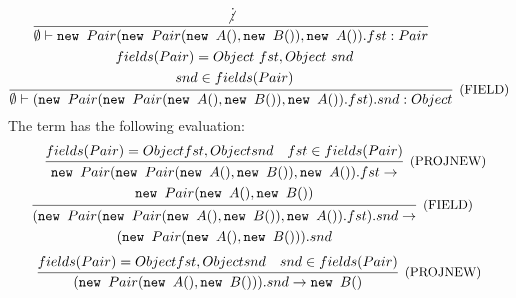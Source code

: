 \begin{itemize}
	      \[
		      \infer[\text{\small{(FIELD)}}]
		      { \emptyset \vdash (\NEW Pair(\NEW Pair(\NEW A(), \NEW B()), \NEW A()).fst).snd: Object }
		      {
			      \begin{gathered}
				      \infer[]
				      { \emptyset \vdash \NEW Pair(\NEW Pair(\NEW A(), \NEW B()), \NEW A()).fst: Pair }
				      { \not\vdots } \\
				      fields(Pair) = Object\ fst, Object\ snd \\
				      snd \in fields(Pair)
			      \end{gathered}
		      }
	      \]
	      The term has the following evaluation:
	      \[
		      \infer[\text{\small{(FIELD)}}]
		      {
			      \begin{gathered}
				      (\NEW Pair(\NEW Pair(\NEW A(), \NEW B()), \NEW A()).fst).snd \to\\
				      (\NEW Pair(\NEW A(), \NEW B())).snd
			      \end{gathered}
		      }
		      {
			      \infer[\text{\small{(PROJNEW)}}]
			      {
				      \begin{gathered}
					      \NEW Pair(\NEW Pair(\NEW A(), \NEW B()), \NEW A()).fst \to \\ \NEW Pair(\NEW A(), \NEW B())
				      \end{gathered}
			      }
			      { fields(Pair) = Object fst, Object snd & fst \in fields(Pair) }
		      }
	      \]
	      \[
		      \infer[\text{\small{(PROJNEW)}}]
		      {(\NEW Pair(\NEW A(), \NEW B())).snd \to \NEW B()}
		      { fields(Pair) = Object fst, Object snd & snd \in fields(Pair) }
	      \]
\end{itemize}
